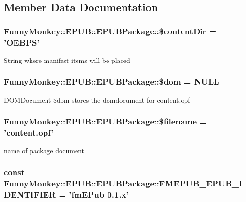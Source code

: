 \subsection{Member Data Documentation}
\hypertarget{classFunnyMonkey_1_1EPUB_1_1EPUBPackage_a8aa605480fb060e3252d240d8872b106}{
\subsubsection[{\$contentDir}]{\setlength{\rightskip}{0pt plus 5cm}FunnyMonkey::EPUB::EPUBPackage::\$contentDir = 'OEBPS'}}
\label{classFunnyMonkey_1_1EPUB_1_1EPUBPackage_a8aa605480fb060e3252d240d8872b106}
String where manifest items will be placed \hypertarget{classFunnyMonkey_1_1EPUB_1_1EPUBPackage_ac404923cc54a532d4f4522a4bfc287b5}{
\subsubsection[{\$dom}]{\setlength{\rightskip}{0pt plus 5cm}FunnyMonkey::EPUB::EPUBPackage::\$dom = NULL}}
\label{classFunnyMonkey_1_1EPUB_1_1EPUBPackage_ac404923cc54a532d4f4522a4bfc287b5}
DOMDocument \$dom stores the domdocument for content.opf \hypertarget{classFunnyMonkey_1_1EPUB_1_1EPUBPackage_a88980c805ce00608029b1db1833003a7}{
\subsubsection[{\$filename}]{\setlength{\rightskip}{0pt plus 5cm}FunnyMonkey::EPUB::EPUBPackage::\$filename = 'content.opf'}}
\label{classFunnyMonkey_1_1EPUB_1_1EPUBPackage_a88980c805ce00608029b1db1833003a7}
name of package document \hypertarget{classFunnyMonkey_1_1EPUB_1_1EPUBPackage_a6e75be3ee6f665e90f89ef6adc96a28d}{
\subsubsection[{FMEPUB\_\-EPUB\_\-IDENTIFIER}]{\setlength{\rightskip}{0pt plus 5cm}const {\bf FunnyMonkey::EPUB::EPUBPackage::FMEPUB\_\-EPUB\_\-IDENTIFIER} = 'fmEPub 0.1.x'}}
